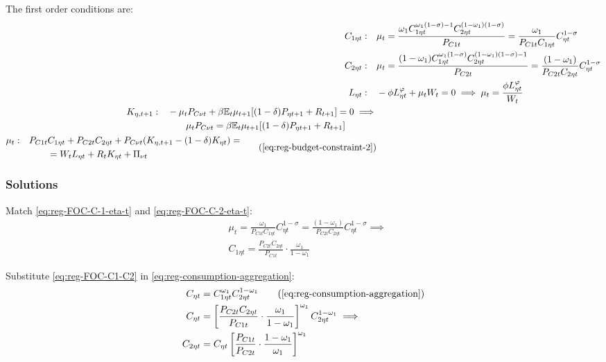 \documentclass[
thesis.tex
]{subfiles}
\begin{document}
The first order conditions are:
\begin{align}
	C_{1\eta t}: \quad & \mu_t = \frac{\omega_1 C_{1\eta t}^{\omega_1 (1 -\sigma) -1} C_{2\eta t}^{(1 -\omega_1)(1 -\sigma)}}{P_{C1t}} = \frac{\omega_1}{P_{C1t} C_{1\eta t}} C_{\eta t}^{1 -\sigma} \label{eq:reg-FOC-C-1-eta-t} \\
	C_{2\eta t}: \quad & \mu_t = \frac{(1 -\omega_1) C_{1\eta t}^{\omega_1 (1 -\sigma)} C_{2\eta t}^{(1 -\omega_1)(1 -\sigma)-1}}{P_{C2t}} = \frac{(1 -\omega_1)}{P_{C2t} C_{2\eta t}} C_{\eta t}^{1 -\sigma} \label{eq:reg-FOC-C-2-eta-t} \\
	L_{\eta t}: \quad & -\phi L_{\eta t}^{\varphi} +\mu_t W_t = 0 \implies \mu_t = \frac{\phi L_{\eta t}^{\varphi}}{W_t} \label{eq:reg-household-FOC-Lt} \\
	\begin{split}
		K_{\eta, t+1}: \quad & -\mu_t P_{C\nu t} +\beta \mathbb{E}_t \mu_{t+1} [(1-\delta) P_{\eta t+1} + R_{t+1}] = 0 \implies \\ & \qquad \mu_t P_{C\nu t} = \beta \mathbb{E}_t \mu_{t+1} [(1-\delta) P_{\eta t+1} + R_{t+1}]
	\end{split} \label{eq:reg-household-FOC-Kt} \\
	\begin{split}
		\mu_t: \quad & P_{C1t} C_{1\eta t} + P_{C2t} C_{2\eta t} + P_{C\nu t} (K_{\eta, t+1} - (1-\delta)K_{\eta t}) = \\ & \qquad = W_t L_{\eta t} + R_t K_{\eta t} + \Pi_{\nu t}
	\end{split} \tag{\ref{eq:reg-budget-constraint-2}}
\end{align}

\subsubsection*{Solutions}

Match \ref{eq:reg-FOC-C-1-eta-t} and \ref{eq:reg-FOC-C-2-eta-t}:
\begin{align}
	& \mu_t = \frac{\omega_1}{P_{C1t} C_{1\eta t}} C_{\eta t}^{1 -\sigma} = \frac{(1 -\omega_1)}{P_{C2t} C_{2\eta t}} C_{\eta t}^{1 -\sigma} \implies \nonumber \\
	& C_{1\eta t} = \frac{P_{C2t} C_{2\eta t}}{P_{C1t}} \cdot \frac{\omega_1}{1 -\omega_1} \label{eq:reg-FOC-C1-C2}
\end{align}

Substitute \ref{eq:reg-FOC-C1-C2} in \ref{eq:reg-consumption-aggregation}:
\begin{align}
	C_{\eta t} &= C_{1\eta t}^{\omega_1} C_{2\eta t}^{1-\omega_1} \tag{\ref{eq:reg-consumption-aggregation}} \\
	C_{\eta t} &= \left[ \frac{P_{C2t} C_{2\eta t}}{P_{C1t}} \cdot \frac{\omega_1}{1 -\omega_1} \right]^{\omega_1} C_{2\eta t}^{1-\omega_1} \implies \nonumber \\
	C_{2\eta t} &= C_{\eta t} \left[ \frac{P_{C1t} }{P_{C2t}} \cdot \frac{1 -\omega_1}{\omega_1} \right]^{\omega_1} \label{eq:reg-C2-Cn}
\end{align}
\end{document}
